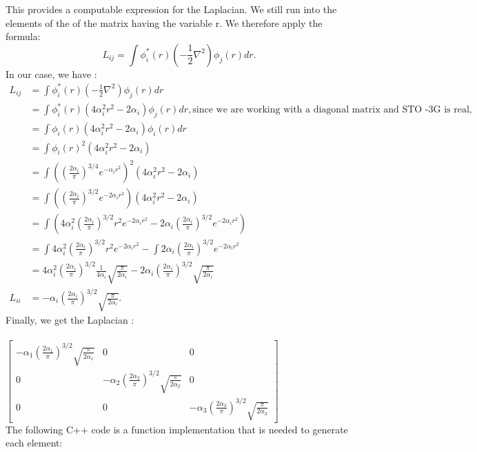 \documentclass{article}
\begin{document}
This provides a computable  expression for the Laplacian. We still run into the elements of the of the matrix having the variable r. We therefore apply the formula: \[L_{ij} = \int \phi^*_i(r) (-\frac{1}{2} \nabla^2 )\phi_j(r)dr. \]
In our case, we have :
\begin{align*}
    L_{ij} &= \int \phi^*_i(r) (-\frac{1}{2} \nabla^2 )\phi_j(r)dr \\
            &= \int \phi^*_i(r) (4\alpha_i^2r^2 - 2\alpha_i) \phi_j(r)dr , \text{since we are working with a diagonal matrix and STO -3G is real,}\\
            &= \int \phi_i(r) (4\alpha_i^2r^2 - 2\alpha_i) \phi_i(r)dr \\
            &= \int \phi_i(r)^2(4\alpha_i^2r^2 - 2\alpha_i)\\
            &= \int \left(  \left( \frac{2\alpha_i}{\pi} \right)^{3/4}e^{-\alpha_i r^2}\right)^2(4\alpha_i^2r^2 - 2\alpha_i)\\
            &= \int \left(  \left( \frac{2\alpha_i}{\pi} \right)^{3/2}e^{-2\alpha_i r^2}\right)(4\alpha_i^2r^2 - 2\alpha_i)\\
            &= \int \left( 4\alpha_i^2 \left( \frac{2\alpha_i}{\pi} \right)^{3/2}r^2e^{-2\alpha_i r^2} - 2\alpha_i \left( \frac{2\alpha_i}{\pi} \right)^{3/2}e^{-2\alpha_i r^2} \right)\\
            &= \int  4\alpha_i^2 \left( \frac{2\alpha_i}{\pi} \right)^{3/2}r^2e^{-2\alpha_i r^2} - \int 2\alpha_i \left( \frac{2\alpha_i}{\pi} \right)^{3/2}e^{-2\alpha_i r^2} \\
            &= 4\alpha_i^2 \left( \frac{2\alpha_i}{\pi} \right)^{3/2} \frac{1}{4\alpha_i} \sqrt{ \frac{\pi}{2\alpha_i}} - 2\alpha_i \left( \frac{2\alpha_i}{\pi} \right)^{3/2}\sqrt{\frac{\pi}{2\alpha_i}}\\
        L_{ii}    &= - \alpha_i \left( \frac{2\alpha_i}{\pi} \right)^{3/2}\sqrt{\frac{\pi}{2\alpha_i}}.
\end{align*}
Finally, we get the Laplacian :
\\
\\
$\begin{bmatrix}
    - \alpha_1 \left( \frac{2\alpha_1}{\pi} \right)^{3/2}\sqrt{\frac{\pi}{2\alpha_1}} & 0 & 0\\
    0 & - \alpha_2 \left( \frac{2\alpha_2}{\pi} \right)^{3/2}\sqrt{\frac{\pi}{2\alpha_2}} & 0 \\
    0& 0& - \alpha_3 \left( \frac{2\alpha_3}{\pi} \right)^{3/2}\sqrt{\frac{\pi}{2\alpha_3}}
\end{bmatrix}$
\\
The following C++ code is a function implementation that is needed to generate each element:
\end{document}
